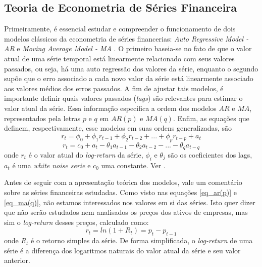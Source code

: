 \documentclass[12pt]{article}
\begin{document}
\subsection{Teoria de Econometria de Séries Financeira}\label{subsec_teoria}
Primeiramente, é essencial estudar e compreender o funcionamento de dois modelos clássicos da econometria de séries financerias: \textit{Auto Regressive Model - AR} e \textit{Moving Average Model - MA} \cite{Tsay}. O primeiro baseia-se no fato de que o valor atual de uma série temporal está linearmente relacionado com seus valores passados, ou seja, há uma auto regressão dos valores da série, enquanto o segundo supõe que o erro associado a cada novo valor da série está linearmente associado aos valores médios dos erros passados. A fim de ajustar tais modelos, é importante definir quais valores passados (\textit{lags}) são relevantes para estimar o valor atual da série. Essa informação especifica a ordem dos modelos $AR$ e $MA$, representados pela letras $p$ e $q$ em $AR(p)$ e $MA(q)$. Enfim, as equações que definem, respectivamente, esse modelos em suas ordens generalizadas, são
\begin{equation}\label{eq_ar(p)}
r_{t}=\phi_{0}+\phi_{1}r_{t-1}+\phi_{2}r_{t-2}+...+\phi_{p}r_{t-p}+a_{t}
\end{equation}
\begin{equation}\label{eq_ma(q)}
r_{t}=c_{0}+a_{t}-\theta_{1}a_{t-1}-\theta_{2}a_{t-2}-...-\theta_{q}a_{t-q}
\end{equation}
onde $r_{t}$ é o valor atual do \textit{log-return} da série, $\phi_{i}$ e $\theta_{j}$ são os coeficientes dos lags, $a_{t}$ é uma \textit{white noise serie} e $c_{0}$ uma constante. Ver \cite{Tsay}.

Antes de seguir com a apresentação teórica dos modelos, vale um comentário sobre as séries financeiras estudadas. Como visto nas equações \ref{eq_ar(p)} e \ref{eq_ma(q)}, não estamos interessados nos valores em si das séries. Isto quer dizer que não serão estudados nem analisados os preços dos ativos de empresas, mas sim o \textit{log-return} desses preços, calculado como:
\begin{equation}\label{eq_logret}
r_{t}=ln(1+R_{t})=p_{t}-p_{t-1}
\end{equation}
onde $R_{t}$ é o retorno simples da série. De forma simplificada, o \textit{log-return} de uma série é a diferença dos logaritmos naturais do valor atual da série e seu valor anterior.
\end{document}
